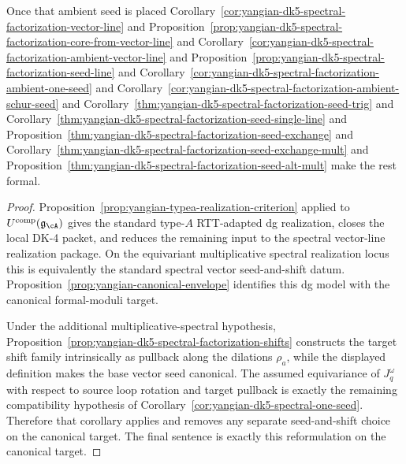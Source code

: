 \begin{corollary}
Once
that ambient seed is placed
Corollary~\ref{cor:yangian-dk5-spectral-factorization-vector-line}
and Proposition~\ref{prop:yangian-dk5-spectral-factorization-core-from-vector-line}
and Corollary~\ref{cor:yangian-dk5-spectral-factorization-ambient-vector-line}
and Proposition~\ref{prop:yangian-dk5-spectral-factorization-seed-line}
and Corollary~\ref{cor:yangian-dk5-spectral-factorization-ambient-one-seed}
and Corollary~\ref{cor:yangian-dk5-spectral-factorization-ambient-schur-seed}
and Corollary~\ref{thm:yangian-dk5-spectral-factorization-seed-trig}
and Corollary~\ref{thm:yangian-dk5-spectral-factorization-seed-single-line}
and Proposition~\ref{thm:yangian-dk5-spectral-factorization-seed-exchange}
and Corollary~\ref{thm:yangian-dk5-spectral-factorization-seed-exchange-mult}
and Proposition~\ref{thm:yangian-dk5-spectral-factorization-seed-alt-mult}
make the rest formal.
\end{corollary}

\begin{proof}
Proposition~\ref{prop:yangian-typea-realization-criterion} applied to
\(U^{\mathrm{comp}}(\mathfrak{g}_{\cA})\) gives the standard type-$A$
RTT-adapted dg realization, closes the local DK-4 packet, and reduces
the remaining input to the spectral vector-line realization package.
On the equivariant multiplicative spectral realization locus this is
equivalently the standard spectral vector seed-and-shift datum.
Proposition~\ref{prop:yangian-canonical-envelope} identifies
this dg model with the canonical formal-moduli target.

Under the additional multiplicative-spectral hypothesis,
Proposition~\ref{prop:yangian-dk5-spectral-factorization-shifts}
constructs the target shift family intrinsically as pullback along the
dilations \(\rho_a\), while the displayed definition makes the base
vector seed canonical. The assumed equivariance of \(J_q^\omega\)
with respect to source loop rotation and target pullback is exactly the
remaining compatibility hypothesis of
Corollary~\ref{cor:yangian-dk5-spectral-one-seed}. Therefore that
corollary applies and removes any separate seed-and-shift choice on the
canonical target. The final sentence is exactly this reformulation on
the canonical target.
\end{proof}

